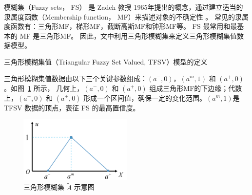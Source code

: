 模糊集（Fuzzy sets， FS） 是 Zadeh 教授 1965年提出的概念，通过建立适当的隶属度函数（Membership function， MF）来描述对象的不确定性 \cite{zadeh1965fuzzy}。 常见的隶属度函数有：三角形MF，梯形MF，截断高斯MF和钟形MF等。 FS 最常用和最基本的 MF 是三角形MF。 因此，文中利用三角形模糊集来定义三角形模糊集值数据模型。

\begin{definition}
    \label{define1}
    三角形模糊集值（Triangular Fuzzy Set Valued, TFSV）模型的定义
\end{definition}
三角形模糊集值数据由以下三个关键参数组成：$(a^-,0)$，$(a^m,1)$ 和 $(a^+,0)$。如图~\ref{fig:tfs} 所示，  几何上，$(a^-,0)$ 和 $(a^+,0)$ 组成三角形MF的下边缘；代数上，$(a^-,0)$ 和 $(a^+,0)$ 形成一个区间值，确保一定的变化范围。$(a^m,1)$是TFSV 数据的顶点，表征 FS 的最高置信度。
\begin{figure}[htbp]
    \centering
    \includegraphics[width=0.5\textwidth]{figures/tfs}
    \caption{三角形模糊集 $\tilde{A}$ 示意图}
    \label{fig:tfs}
\end{figure}

